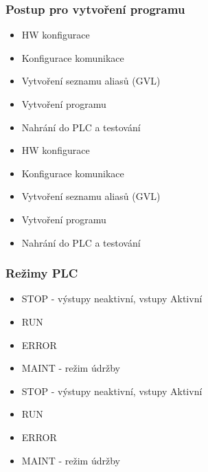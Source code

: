 \begin{figure}[h]
\subsubsection*{Postup pro vytvoření programu}
\begin{itemize}
  \item HW konfigurace 
  \item Konfigurace komunikace
  \item Vytvoření seznamu aliasů (GVL)
  \item Vytvoření programu
  \item Nahrání do PLC a testování
    \item HW konfigurace
    \item Konfigurace komunikace
    \item Vytvoření seznamu aliasů (GVL)
    \item Vytvoření programu
    \item Nahrání do PLC a testování
\end{itemize}

\subsubsection*{Režimy PLC}
\begin{itemize}
  \item STOP - výstupy neaktivní, vstupy Aktivní
  \item RUN 
  \item ERROR 
  \item MAINT - režim údržby
    \item STOP - výstupy neaktivní, vstupy Aktivní
    \item RUN
    \item ERROR
    \item MAINT - režim údržby
\end{itemize}


\end{figure}
